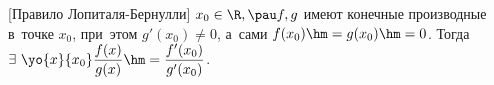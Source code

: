 [Правило Лопиталя-Бернулли]\label{Lop}
    $x_0\in\R,\pau f,g$ имеют конечные производные в~точке $x_0$, при~этом $g'(x_0)\neq0$, а~сами $f(x_0)\hm=g(x_0)\hm=0$.
    Тогда $\exists\ \yo{x}{x_0}\dfrac{f(x)}{g(x)}\hm=\dfrac{f'(x_0)}{g'(x_0)}$.

